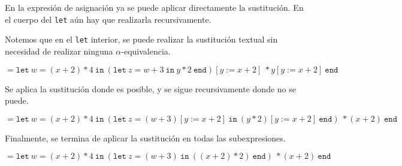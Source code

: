 \documentclass{article}
\begin{document}
\begin{enumerate}
{    	En la expresión de asignación ya se puede aplicar directamente la
    	sustitución. En el cuerpo del \texttt{let} aún hay que realizarla
    	recursivamente. 
    	
    	Notemos que en el \texttt{let} interior, se puede realizar la
    	sustitución textual sin necesidad de realizar ninguna
    	$\alpha$-equivalencia.
    	
    	\[
    	=
    	\texttt{let} \ w = (x + 2) \ast 4 \ \texttt{in} \ 
    	(\texttt{let} \ z = w + 3 \ \texttt{in} \ 
    	y \ast 2 \ \texttt{end})[y := x + 2] \ \ast y [y := x + 2] \ 
    	\texttt{end} 
    	\]
    	
    	Se aplica la sustitución donde es posible, y se sigue recursivamente
    	donde no se puede.
    	
    	\[
    	=
    	\texttt{let} \ w = (x + 2) \ast 4 \ \texttt{in} \ 
    	(\texttt{let} \ z = (w + 3) [y := x + 2] \ \texttt{in} \ 
    	(y \ast 2 ) [y := x + 2]\ \texttt{end}) \ \ast (x + 2) \ 
    	\texttt{end} 
    	\]
    	
    	Finalmente, se termina de aplicar la sustitución en todas las
    	subexpresiones.
    	
    	\[
    	=
    	\texttt{let} \ w = (x + 2) \ast 4 \ \texttt{in} \ 
    	(\texttt{let} \ z = (w + 3) \ \texttt{in} \ 
    	((x + 2) \ast 2 ) \ \texttt{end}) \ \ast (x + 2) \ 
    	\texttt{end}
    	\]
    	
    }
    \end{enumerate}
\end{document}
